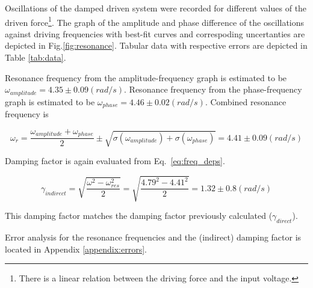 Oscillations of the damped driven system were recorded for different values of the driven force\footnote{There is a linear relation between the driving force and the input voltage.}. The graph of the amplitude and phase difference of the oscillations against driving frequencies with best-fit curves and correspoding uncertanties are depicted in Fig.\ref{fig:resonance}. Tabular data with respective errors are depicted in Table \ref{tab:data}.

Resonance frequency from the amplitude-frequency graph is estimated to be $\omega_{amplitude} = 4.35 \pm 0.09 (rad/s)$. Resonance frequency from the phase-frequency graph is estimated to be $\omega_{phase} = 4.46 \pm 0.02 (rad/s)$. Combined resonance frequency is

\begin{equation*}
\omega_{r} = \frac{\omega_{amplitude} + \omega_{phase}}{2} \pm \sqrt{\sigma(\omega_{amplitude}) + \sigma(\omega_{phase})} = 4.41 \pm 0.09 (rad/s)
\end{equation*}

Damping factor is again evaluated from Eq.~\ref{eq:freq_deps}.

\begin{equation*}
        \gamma_{indirect} = \sqrt{ \frac{\omega^2 - \omega_{res}^2}{2} } = \sqrt{ \frac{4.79^2 - 4.41^2}{2} } = 1.32 \pm 0.8 (rad/s)
\end{equation*}       

This damping factor matches the damping factor previously calculated ($\gamma_{direct}$).

Error analysis for the resonance frequencies and the (indirect) damping factor is located in Appendix \ref{appendix:errors}.
